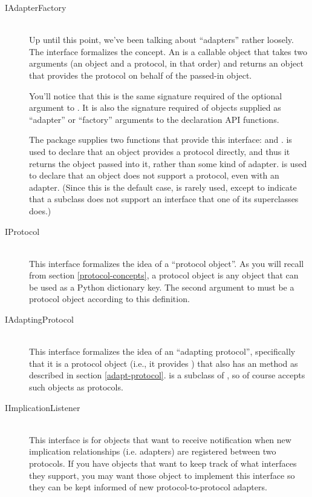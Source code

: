 \begin{verbatim%
}
\begin{verbatim%
}
\begin{verbatim%
}
\begin{verbatim%
}
\begin{description}

\item[IAdapterFactory] \hfill \\
Up until this point, we've been talking about ``adapters'' rather loosely.  The
 interface formalizes the concept.  An  is a callable object that takes two arguments (an object and a
protocol, in that order) and returns an object that provides the protocol on
behalf of the passed-in object.

You'll notice that this is the same signature required of the optional
 argument to .  It is also the signature required
of objects supplied as ``adapter'' or ``factory'' arguments to the declaration
API functions.

The  package supplies two functions that provide
this interface:  and .
 is used to declare that an object provides a
protocol directly, and thus it returns the object passed into it, rather than
some kind of adapter.   is used to declare that an
object does not support a protocol, even with an adapter.  (Since this is the
default case,  is rarely used, except to indicate
that a subclass does not support an interface that one of its superclasses
does.)

\item[IProtocol] \hfill \\
This interface formalizes the idea of a ``protocol object''.  As you will
recall from section \ref{protocol-concepts}, a protocol object is any object
that can be used as a Python dictionary key.  The second argument to
 must be a protocol object according to this definition.


\item[IAdaptingProtocol] \hfill \\
This interface formalizes the idea of an ``adapting protocol'', specifically
that it is a protocol object (i.e., it provides ) that also
has an  method as described in section \ref{adapt-protocol}.
 is a subclass of , so of course
 accepts such objects as protocols.

\item[IImplicationListener] \hfill \\
This interface is for objects that want to receive notification when new
implication relationships (i.e. adapters) are registered between two protocols.
If you have objects that want to keep track of what interfaces they support,
you may want those object to implement this interface so they can be kept
informed of new protocol-to-protocol adapters.


\end{description}
\end{verbatim%
}
\end{verbatim%
}
\end{verbatim%
}
\end{verbatim%
}
